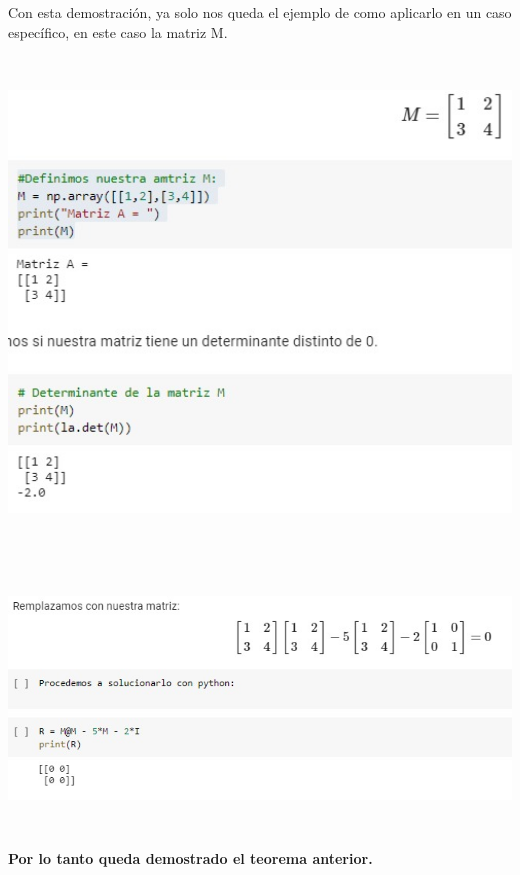 \documentclass[12pt]{article}
\begin{document}
Con esta demostración, ya solo nos queda el ejemplo de como aplicarlo en un caso específico, en este caso la matriz M.\\

    \begin{center}
	\includegraphics[height=13cm]{E2.3.jpeg}\\
    \end{center}

    \begin{center}
	\includegraphics[height=7cm]{E2.5.jpeg}\\
    \end{center}
\textbf{Por lo tanto queda demostrado el teorema anterior.}\\
\end{document}
